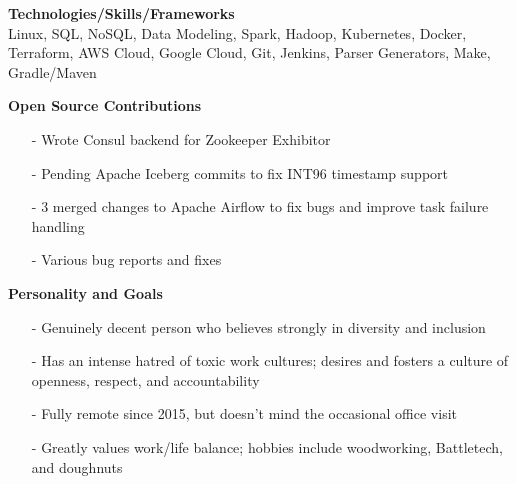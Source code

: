 \documentclass[a4paper,11pt]{article}
\begin{document}
\vspace{0.1in}

\textbf{Technologies/Skills/Frameworks} \\
Linux, SQL, NoSQL, Data Modeling, Spark, Hadoop, Kubernetes, Docker, Terraform, AWS Cloud, Google Cloud, Git, Jenkins, Parser Generators, Make, Gradle/Maven

\vspace{0.1in}

\textbf{Open Source Contributions}
\begin{itemize}
    \item[-]Wrote Consul backend for Zookeeper Exhibitor
    \item[-]Pending Apache Iceberg commits to fix INT96 timestamp support
    \item[-]3 merged changes to Apache Airflow to fix bugs and improve task failure handling
    \item[-]Various bug reports and fixes
\end{itemize}

\vspace{0.1in}
\textbf{Personality and Goals}
\begin{itemize}
    \item[-]Genuinely decent person who believes strongly in diversity and inclusion
    \item[-]Has an intense hatred of toxic work cultures; desires and fosters a culture of openness, respect, and accountability
    \item[-]Fully remote since 2015, but doesn't mind the occasional office visit
    \item[-]Greatly values work/life balance; hobbies include woodworking, Battletech, and doughnuts
\end{itemize}
\end{document}
